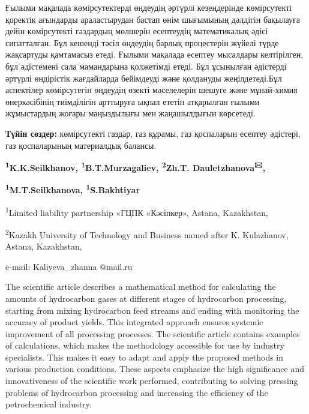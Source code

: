 Ғылыми мақалада көмірсутектерді өңдеудің әртүрлі кезеңдерінде
көмірсутекті қоректік ағындарды араластырудан бастап өнім шығымының
дәлдігін бақылауға дейін көмірсутекті газдардың мөлшерін есептеудің
математикалық әдісі сипатталған. Бұл кешенді тәсіл өңдеудің барлық
процестерін жүйелі түрде жақсартуды қамтамасыз етеді. Ғылыми мақалада
есептеу мысалдары келтірілген, бұл әдістемені сала мамандарына
қолжетімді етеді. Бұл ұсынылған әдістерді әртүрлі өндірістік жағдайларда
бейімдеуді және қолдануды жеңілдетеді.Бұл аспектілер көмірсутегін
өңдеудің өзекті мәселелерін шешуге және мұнай-химия өнеркәсібінің
тиімділігін арттыруға ықпал ететін атқарылған ғылыми жұмыстардың жоғары
маңыздылығы мен жаңашылдығын көрсетеді.

{\bfseries Түйін сөздер:} көмірсутекті газдар, газ құрамы, газ қоспаларын
есептеу әдістері, газ қоспаларының материалдық балансы.


\begin{center}
{\bfseries \textsuperscript{1}K.K.Seilkhanov,
\textsuperscript{1}B.T.Murzagaliev, \textsuperscript{2}Zh.T.
Dauletzhanova\textsuperscript{🖂},}

{\bfseries \textsuperscript{1}M.T.Seilkhanova,
\textsuperscript{1}S.Bakhtiyar}

\textsuperscript{1}Limited liability partnership «ГЦПК «Кəсіпкер»,
Astana, Kazakhstan,

\textsuperscript{2}Kazakh University of Technology and Business named
after K. Kulazhanov, Astana, Kazakhstan,

e-mail: Kaliyeva\_zhanna @mail.ru
\end{center}

The scientific article describes a mathematical method for calculating
the amounts of hydrocarbon gases at different stages of hydrocarbon
processing, starting from mixing hydrocarbon feed streams and ending
with monitoring the accuracy of product yields. This integrated approach
ensures systemic improvement of all processing processes. The scientific
article contains examples of calculations, which makes the methodology
accessible for use by industry specialists. This makes it easy to adapt
and apply the proposed methods in various production conditions. These
aspects emphasize the high significance and innovativeness of the
scientific work performed, contributing to solving pressing problems of
hydrocarbon processing and increasing the efficiency of the
petrochemical industry.

